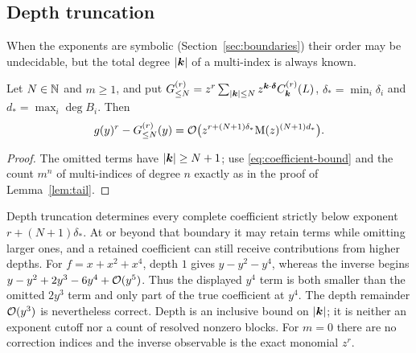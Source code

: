 \subsection{Depth truncation}

When the exponents are symbolic (Section~\ref{sec:boundaries}) their order may be undecidable, but the total degree $|\boldsymbol k|$ of a multi-index is always known.

\begin{theorem}
\label{thm:depth}
Let $N\in\mathbb N$ and $m\ge1$, and put
$G^{(r)}_{\le N}=z^r\sum_{|\boldsymbol k|\le N}z^{\boldsymbol k\cdot\boldsymbol\delta}C^{(r)}_{\boldsymbol k}(L)$,
$\delta_*=\min_i\delta_i$ and $d_*=\max_i\deg B_i$. Then
\begin{equation}
 g(y)^r-G^{(r)}_{\le N}(y)=\mathcal O\bigl(z^{r+(N+1)\delta_*}\mathrm M(z)^{(N+1)d_*}\bigr).
 \label{eq:depth-remainder}
\end{equation}
\end{theorem}
\begin{proof}
The omitted terms have $|\boldsymbol k|\ge N+1$; use \eqref{eq:coefficient-bound} and the count $m^n$ of multi-indices of degree $n$ exactly as in the proof of Lemma~\ref{lem:tail}.
\end{proof}

Depth truncation determines every complete coefficient strictly below
exponent $r+(N+1)\delta_*$. At or beyond that boundary it may retain
terms while omitting larger ones, and a retained coefficient can still
receive contributions from higher depths. For $f=x+x^2+x^4$, depth $1$
gives $y-y^2-y^4$, whereas the inverse begins
$y-y^2+2y^3-6y^4+\mathcal O(y^5)$. Thus the displayed $y^4$ term is both
smaller than the omitted $2y^3$ term and only part of the true coefficient
at $y^4$. The depth remainder $\mathcal O(y^3)$ is nevertheless correct.
Depth is an inclusive bound on $|\boldsymbol k|$; it is neither an exponent cutoff
nor a count of resolved nonzero blocks. For $m=0$ there are no correction
indices and the inverse observable is the exact monomial $z^r$.
